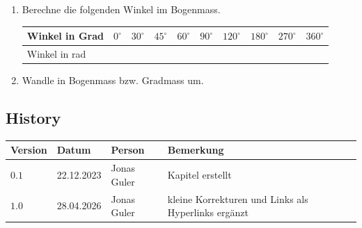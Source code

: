 \documentclass[11pt,oneside]{article}
\begin{document}
	\begin{aufgabe}
		\begin{enumerate}[label=\alph*)]
			\item Berechne die folgenden Winkel im Bogenmass.
			\begin{table}[H]
				\centering
				\begin{tabular}{m{3cm}|m{0.8cm}|m{0.8cm}|m{0.8cm}|m{0.8cm}|m{0.8cm}|m{0.8cm}|m{0.8cm}|m{0.8cm}|m{0.8cm}}
					Winkel in Grad & $0^\circ$ & $30^\circ$ & $45^\circ$ & $60^\circ$ & $90^\circ$ & $120^\circ$ & $180^\circ$ & $270^\circ$ & $360^\circ$\\\hline
					Winkel in rad & & & & & & & & & \\
				\end{tabular}
			\end{table}
			\item Wandle in Bogenmass bzw. Gradmass um.
			\begin{enumerate}[label=\roman*)]\end{enumerate}
		\end{enumerate}
	\end{aufgabe}\newpage



\subsection*{History}
\begin{table}[H]
	\centering
	\begin{tabular}{|p{13mm}|p{20mm}|p{30mm}|p{70mm}|}\hline
		Version & Datum & Person & Bemerkung \\\hline
		$0.1$ & 22.12.2023 & Jonas Guler & Kapitel erstellt \\\hline
		$1.0$ & 28.04.2026 & Jonas Guler & kleine Korrekturen und Links als Hyperlinks ergänzt \\\hline
	\end{tabular}
\end{table}
\end{document}
